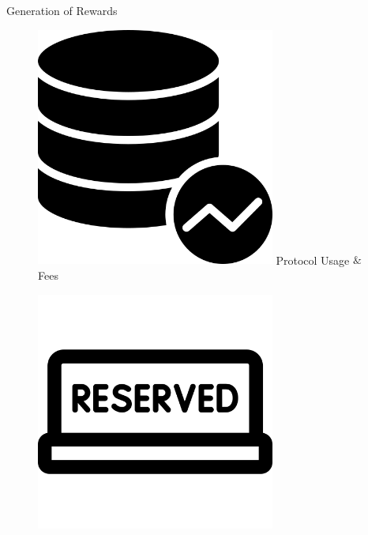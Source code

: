 \documentclass[handout]{beamer}
\begin{document}
\begin{frame}{Generation of Rewards}
\vspace{1em}


\begin{figure}[H]
  \begin{minipage}[t]{.25\textwidth}
  	\center 
    \includegraphics[width=0.7\textwidth]{../assets/images/database-usage.png}
    \vspace{0.8em}\vspace{0.8em}
    Protocol Usage $\&$ Fees
  \end{minipage}
  \hfill
  \begin{minipage}[t]{.25\textwidth}
  \center 
    \includegraphics[width=0.7\textwidth]{../assets/images/reserved.png}
	\vspace{0.8em}\vspace{0.8em}    

\end{minipage}
\end{figure}
\end{frame}
\end{document}
